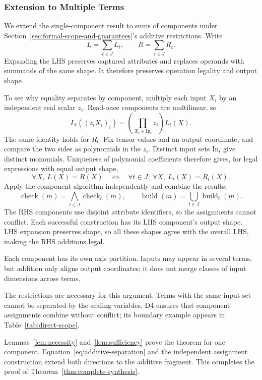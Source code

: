 \subsubsection{Extension to Multiple Terms}
\label{app:extension-to-multiple-terms}
We extend the single-component result to sums of components under
Section~\ref{sec:formal-scope-and-guarantees}'s additive restrictions. Write
\begin{equation}
 L=\sum_{t\in J}L_t,\qquad R=\sum_{t\in J}R_t.
\end{equation}
Expanding the LHS preserves captured attributes and replaces operands with
summands of the same shape. It therefore preserves operation legality and
output shape.

To see why equality separates by component, multiply each input $X_i$ by
an independent real scalar $z_i$. Read-once components are multilinear, so
\begin{equation}
 L_t((z_iX_i)_i)=\left(\prod_{X_i\in \mathrm{In}_t}z_i\right)L_t(X).
\end{equation}
The same identity holds for $R_t$. Fix tensor values and an output
coordinate, and compare the two sides as polynomials in the $z_i$.
Distinct input sets $\mathrm{In}_t$ give distinct monomials. Uniqueness of polynomial
coefficients therefore gives, for legal expressions with equal output shape,
\begin{equation}
 \forall X,\ L(X)=R(X)
 \quad\iff\quad
 \forall t\in J,\ \forall X,\ L_t(X)=R_t(X).
 \label{eq:additive-separation}
\end{equation}
Apply the component algorithm independently and combine the results:
\begin{equation}
 \operatorname{check}(m)=\bigwedge_{t\in J}\operatorname{check}_t(m),
 \qquad
 \operatorname{build}(m)=\bigcup_{t\in J}\operatorname{build}_t(m).
 \label{eq:additive-construction}
\end{equation}
The RHS components use disjoint attribute identifiers, so the assignments
cannot conflict. Each successful construction has its LHS component's
output shape. LHS expansion preserves shape, so all these shapes agree
with the overall LHS, making the RHS additions legal.

Each component has its own axis partition. Inputs may appear in several
terms, but addition only aligns output coordinates; it does not merge classes of input dimensions across terms.

The restrictions are necessary for this argument. Terms with the same
input set cannot be separated by the scaling variables. D4 ensures that
component assignments combine without conflict; its boundary example
appears in Table~\ref{tab:direct-scope}.

Lemmas~\ref{lem:necessity} and~\ref{lem:sufficiency} prove the theorem for
one component. Equation~\eqref{eq:additive-separation} and the independent
assignment construction extend both directions to the additive fragment.
This completes the proof of Theorem~\ref{thm:complete-synthesis}.
